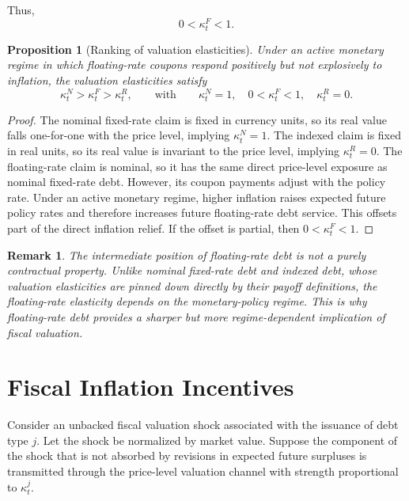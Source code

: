 \documentclass[12pt,a4paper]{article}
\newtheorem{proposition}{Proposition}
\newtheorem{remark}{Remark}
\begin{document}
Thus,
\begin{equation}
0 < \kappa_t^F < 1.
\label{eq:kappa_float_bounds}
\end{equation}


\begin{proposition}[Ranking of valuation elasticities]
\label{prop:kappa_ranking}
Under an active monetary regime in which floating-rate coupons respond positively but
not explosively to inflation, the valuation elasticities satisfy
\begin{equation}
\kappa_t^N > \kappa_t^F > \kappa_t^R,
\qquad
\text{with}
\qquad
\kappa_t^N=1,
\quad
0<\kappa_t^F<1,
\quad
\kappa_t^R=0.
\label{eq:kappa_ranking}
\end{equation}
\end{proposition}



\begin{proof}
The nominal fixed-rate claim is fixed in currency units, so its real value falls
one-for-one with the price level, implying $\kappa_t^N=1$. The indexed claim is fixed in
real units, so its real value is invariant to the price level, implying $\kappa_t^R=0$.
The floating-rate claim is nominal, so it has the same direct price-level exposure as
nominal fixed-rate debt. However, its coupon payments adjust with the policy rate.
Under an active monetary regime, higher inflation raises expected future policy rates
and therefore increases future floating-rate debt service. This offsets part of the direct
inflation relief. If the offset is partial, then $0<\kappa_t^F<1$.
\end{proof}

\begin{remark}
The intermediate position of floating-rate debt is not a purely contractual property.
Unlike nominal fixed-rate debt and indexed debt, whose valuation elasticities are pinned
down directly by their payoff definitions, the floating-rate elasticity depends on the
monetary-policy regime. This is why floating-rate debt provides a sharper but more
regime-dependent implication of fiscal valuation.
\end{remark}

\section{Fiscal Inflation Incentives}

Consider an unbacked fiscal valuation shock associated with the issuance of debt type
$j$. Let the shock be normalized by market value. Suppose the component of the shock
that is not absorbed by revisions in expected future surpluses is transmitted through the
price-level valuation channel with strength proportional to $\kappa_t^j$.
\end{document}
